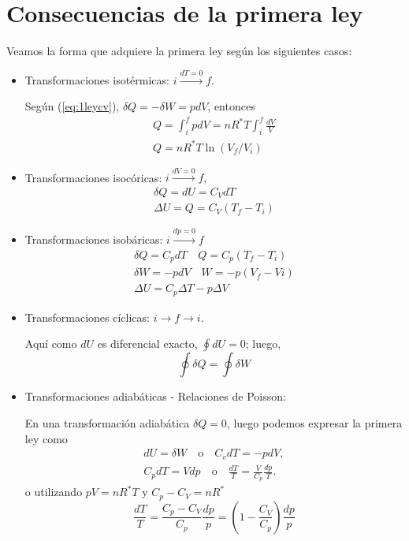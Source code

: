 \documentclass[openany]{book}
\begin{document}
\section{Consecuencias de la primera ley}
Veamos la forma que adquiere la primera ley según los siguientes casos:
\begin{itemize}
	\item Transformaciones isotérmicas: $i\xrightarrow{dT=0}f$.\par Según (\ref{eq:1leycv}), $\delta Q=-\delta W=pdV$, entonces
	      \begin{gather*}
		      Q=\int_{i}^{f}pdV=nR^*T\int_{i}^{f}\frac{dV}{V}\\
		      Q=nR^*T\ln{(V_f/V_i)}
	      \end{gather*}
	\item Transformaciones isocóricas: $i\xrightarrow{dV=0}f$,
	      \begin{gather*}
		      \delta Q=dU=C_VdT\\
		      \Delta U=Q=C_V(T_f-T_i)
	      \end{gather*}
	\item Transformaciones isobáricas: $i\xrightarrow{dp=0}f$
	      \begin{gather*}
		      \delta Q=C_pdT\quad Q=C_p(T_f-T_i)\\
		      \delta W=-pdV\quad W=-p(V_f-Vi)\\
		      \Delta U=C_p\Delta T-p\Delta V
	      \end{gather*}
	\item Transformaciones cíclicas: $i\rightarrow f\rightarrow i$. \par Aquí como $dU$ es diferencial exacto, $\oint dU=0$; luego,
	      \begin{equation*}
		      \oint\delta Q=\oint\delta W
	      \end{equation*}
	\item Transformaciones adiabáticas - Relaciones de Poisson: \par En una transformación adiabática $\delta Q=0$, luego podemos expresar la primera ley como
	      \begin{gather*}
		      dU=\delta W\quad\mathrm{o}\quad C_vdT=-pdV,\\
		      C_pdT=Vdp\quad\mathrm{o}\quad \frac{dT}{T}=\frac{V}{C_p}\frac{dp}{T}.
	      \end{gather*}
	      o utilizando $pV=nR^*T$ y $C_p-C_V=nR^*$
	      \begin{equation*}
		      \frac{dT}{T}=\frac{C_p-C_V}{C_p}\frac{dp}{p}=\left(1-\frac{C_V}{C_p}\right)\frac{dp}{p}

\end{equation*}
\end{itemize}
\end{document}
